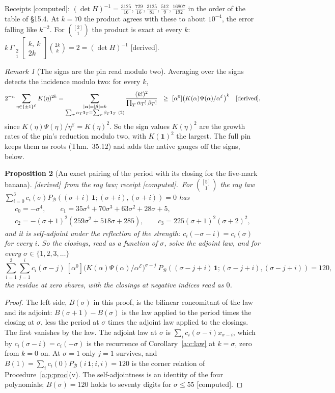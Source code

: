 \documentclass[11pt]{article}
\newcommand{\cE}{\mathcal E}
\newcommand{\cB}{\mathcal B}
\newcommand{\one}{\mathbf 1}
\newcommand{\Gst}[4]{\Gamma_{\substack{#1\\#2}}\!\begin{bmatrix}#3\\#4\end{bmatrix}}
\newcommand{\Pc}[1]{P_{\cB}(#1\,\one;#1,#1)}
\newcommand{\Clo}[1]{[\alpha^0]\big(K(\alpha)\Psi(\alpha)/\alpha^{\cE}\big)^{#1}}
\theoremstyle{plain}
\newtheorem{proposition}{Proposition}[section]
\theoremstyle{definition}
\theoremstyle{remark}
\newtheorem{remark}[proposition]{Remark}
\newcommand{\derived}{\textup{[derived]}}
\newcommand{\computed}{\textup{[computed]}}
\begin{document}
\noindent Receipts \computed: $(\det H)^{-1}=\frac{3125}{16},\frac{729}{16},\frac{3125}{81},\frac{512}9,\frac{16807}{192}$ in the order of the table of \S15.4. At $k=70$ the product agrees with these to about $10^{-4}$, the error falling like $k^{-2}$. For $\binom{[2]}1$ the product is exact at every $k$: $k\,\Gst21{k,\ k}{2k}\binom{2k}k=2=(\det H)^{-1}$ \derived.

\begin{remark}[The signs are the pin read modulo two]\label{a:auto:15.12}
Averaging over the signs detects the incidence modulo two: for every $k$,
\[
2^{-n}\sum_{\eta\in\{\pm1\}^{\cE}}K(\eta)^{2k}=\sum_{\substack{|\boldsymbol\alpha|=|\boldsymbol\beta|=k\\ \sum_T\alpha_T\one_T\equiv\sum_T\beta_T\one_T\ (2)}}\frac{(k!)^2}{\prod_T\alpha_T!\,\beta_T!}\ \ \ge\ \Clo k\quad\derived,
\]
since $K(\eta)\Psi(\eta)/\eta^{\cE}=K(\eta)^2$. So the sign values $K(\eta)^2$ are the growth rates of the pin's reduction modulo two, with $K(\one)^2$ the largest. The full pin keeps them as roots (Thm.~35.12) and adds the native gauges off the signs, below.
\end{remark}

\begin{proposition}[An exact pairing of the period with its closing for the five-mark banana]\label{a:p:pairing}\derived\ from the ray law; receipt \computed.\ For $\binom{[5]}1$ the ray law $\sum_{i=0}^3c_i(\sigma)\Pc{(\sigma+i)}=0$ has
\begin{gather*}
c_0=-\sigma^4,\qquad c_1=35\sigma^4+70\sigma^3+63\sigma^2+28\sigma+5,\\
c_2=-(\sigma+1)^2(259\sigma^2+518\sigma+285),\qquad c_3=225(\sigma+1)^2(\sigma+2)^2,
\end{gather*}
and it is self-adjoint under the reflection of the strength: $c_i(-\sigma-i)=c_i(\sigma)$ for every $i$. So the closings, read as a function of $\sigma$, solve the adjoint law, and for every $\sigma\in\{1,2,3,\dots\}$
\[
\sum_{i=1}^3\sum_{j=1}^ic_i(\sigma-j)\ \Clo{\sigma-j}\ \Pc{(\sigma-j+i)}=120,
\]
the residue at zero shares, with the closings at negative indices read as $0$.
\end{proposition}

\begin{proof}
The left side, $B(\sigma)$ in this proof, is the bilinear concomitant of the law and its adjoint: $B(\sigma+1)-B(\sigma)$ is the law applied to the period times the closing at $\sigma$, less the period at $\sigma$ times the adjoint law applied to the closings. The first vanishes by the law. The adjoint law at $\sigma$ is $\sum_ic_i(\sigma-i)x_{\sigma-i}$, which by $c_i(\sigma-i)=c_i(-\sigma)$ is the recurrence of Corollary~\ref{a:c:law} at $k=\sigma$, zero from $k=0$ on. At $\sigma=1$ only $j=1$ survives, and $B(1)=\sum_ic_i(0)\Pc i=120$ is the corner relation of Procedure~\ref{a:p:proc}(v). The self-adjointness is an identity of the four polynomials; $B(\sigma)=120$ holds to seventy digits for $\sigma\le55$ \computed.
\end{proof}
\end{document}
